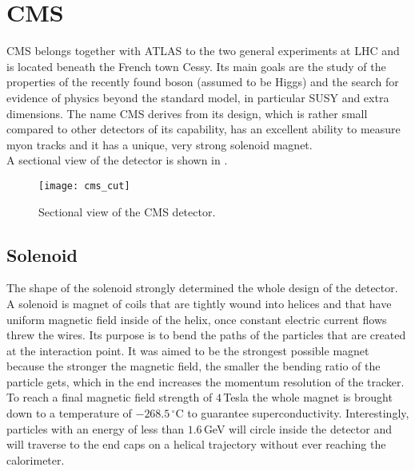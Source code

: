 \section{\ac{CMS}}
\ac{CMS} belongs together with \ac{ATLAS} to the two general experiments at \ac{LHC} and is located beneath the French town Cessy. Its main goals are the study of the properties of the recently found boson (assumed to be Higgs) and the search for evidence of physics beyond the standard model, in particular \ac{SUSY} and extra dimensions. The name \ac{CMS} derives from its design, which is rather small compared to other detectors of its capability, has an excellent ability to measure myon tracks and it has a unique, very strong solenoid magnet.\\
A sectional view of the detector is shown in .
\begin{figure}[ht]
	\centering
	\texttt{[image: cms\_cut]}
	\caption{Sectional view of the CMS detector.}
	\label{p19}
\end{figure}
\subsection{Solenoid}
The shape of the solenoid strongly determined the whole design of the detector. A solenoid is magnet of coils that are tightly wound into helices and that have uniform magnetic field inside of the helix, once constant electric current flows threw the wires. Its purpose is to bend the paths of the particles that are created at the interaction point. It was aimed to be the strongest possible magnet because the stronger the magnetic field, the smaller the bending ratio of the particle gets, which in the end increases the momentum resolution of the tracker. To reach a final magnetic field strength of $4\,$Tesla the whole magnet is brought down to a temperature of $-268.5\,^{\circ}$C to guarantee superconductivity. Interestingly, particles with an energy of less than $1.6\,$GeV will circle inside the detector and will traverse to the end caps on a helical trajectory without ever reaching the calorimeter. 
